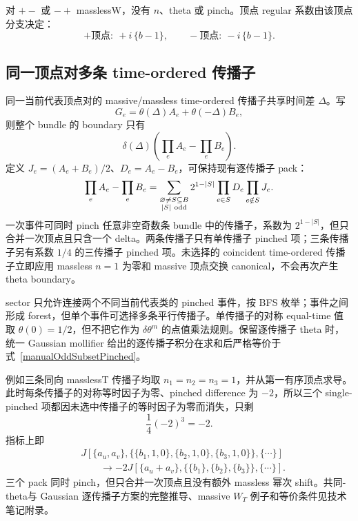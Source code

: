 ﻿\documentclass[a4paper,11pt]{article}
\begin{document}
对 $+-$ 或 $-+$ masslessW，没有 $n$、theta 或 pinch。顶点 regular 系数由该顶点分支决定：
\begin{equation}
 +\text{顶点}:\ +i\,\{b-1\},
 \qquad
 -\text{顶点}:\ -i\,\{b-1\}.
\end{equation}

\subsection{同一顶点对多条 time-ordered 传播子}

同一当前代表顶点对的 massive/massless time-ordered 传播子共享时间差 $\Delta$。写
\begin{equation}
 G_e=\theta(\Delta)A_e+\theta(-\Delta)B_e,
\end{equation}
则整个 bundle 的 boundary 只有
\begin{equation}
 \delta(\Delta)\left(\prod_eA_e-\prod_eB_e\right).
\end{equation}
定义 $J_e=(A_e+B_e)/2$、$D_e=A_e-B_e$，可保持现有逐传播子 pack：
\begin{equation}
 \prod_eA_e-\prod_eB_e
 =\sum_{\substack{\varnothing\ne S\subseteq B\\|S|\ {\rm odd}}}
 2^{1-|S|}\prod_{e\in S}D_e\prod_{e\notin S}J_e.
 \label{manualOddSubsetPinched}
\end{equation}
一次事件可同时 pinch 任意非空奇数条 bundle 中的传播子，系数为 $2^{1-|S|}$，但只合并一次顶点且只含一个 delta。两条传播子只有单传播子 pinched 项；三条传播子另有系数 $1/4$ 的三传播子 pinched 项。未选择的 coincident time-ordered 传播子立即应用 massless $n=1$ 为零和 massive 顶点交换 canonical，不会再次产生 theta boundary。

sector 只允许连接两个不同当前代表类的 pinched 事件，按 BFS 枚举；事件之间形成 forest，但单个事件可选择多条平行传播子。单传播子的对称 equal-time 值取 $\theta(0)=1/2$，但不把它作为 $\delta\theta^m$ 的点值乘法规则。保留逐传播子 theta 时，统一 Gaussian mollifier 给出的逐传播子积分在求和后严格等价于式~\eqref{manualOddSubsetPinched}。

例如三条同向 masslessT 传播子均取 $n_1=n_2=n_3=1$，并从第一有序顶点求导。此时每条传播子的对称等时因子为零、pinched difference 为 $-2$，所以三个 single-pinched 项都因未选中传播子的等时因子为零而消失，只剩
\begin{equation}
 \frac14(-2)^3=-2.
\end{equation}
指标上即
\begin{align}
 &J[\{a_u,a_v\},
   \{\{b_1,1,0\},\{b_2,1,0\},\{b_3,1,0\}\},\{\cdots\}]
 \nonumber\\
 &\qquad\longrightarrow
 -2J[\{a_u+a_v\},\{\{b_1\},\{b_2\},\{b_3\}\},\{\cdots\}].
\end{align}
三个 pack 同时 pinch，但只合并一次顶点且没有额外 massless 幂次 shift。共同-theta与 Gaussian 逐传播子方案的完整推导、massive $W_T$ 例子和等价条件见技术笔记附录。
\end{document}
